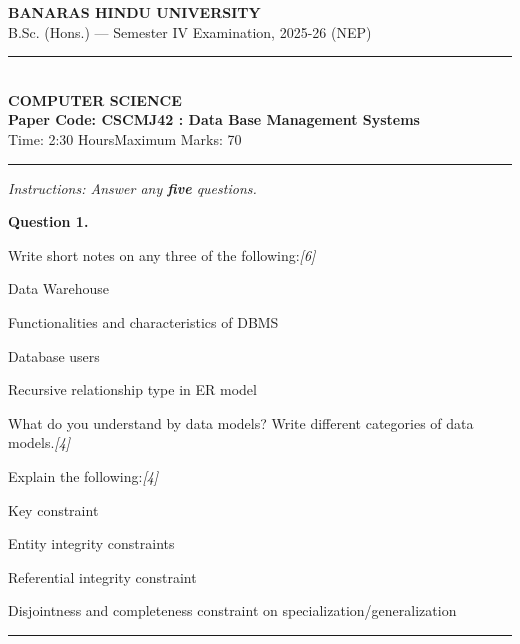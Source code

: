 \documentclass[11pt,a4paper]{article}
\newcommand{\pts}[1]{\hfill   \textit{[#1]}}
\begin{document}
\begin{center}
  {\large\bfseries BANARAS HINDU UNIVERSITY}\\[2pt]
  {\normalsize B.Sc. (Hons.) --- Semester IV Examination, 2025-26 (NEP)}\\[6pt]
  \rule{0.8\linewidth}{0.5pt}\\[6pt]
  {\large\bfseries COMPUTER SCIENCE}\\[4pt]
  {\large\bfseries Paper Code: CSCMJ42 : Data Base Management Systems}\\[4pt]
  {\normalsize Time: 2:30 Hours\hfill Maximum Marks: 70}
\end{center}

\rule{\linewidth}{0.4pt}

\smallskip



\noindent   \textit{Instructions: Answer any   \textbf{five} questions.}

\bigskip




\noindent   \textbf{Question 1.}

\begin{parts}
  \item Write short notes on any three of the following:\pts{6}
  
\begin{parts}
    \item Data Warehouse
    \item Functionalities and characteristics of DBMS
    \item Database users
    \item Recursive relationship type in ER model
  \end{parts}
  \item What do you understand by data models? Write different categories of data models.\pts{4}
  \item Explain the following:\pts{4}
  
\begin{parts}
    \item Key constraint
    \item Entity integrity constraints
    \item Referential integrity constraint
    \item Disjointness and completeness constraint on specialization/generalization
  \end{parts}
\end{parts}

\medskip\rule{\linewidth}{0.2pt}\medskip
\end{document}
